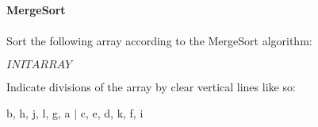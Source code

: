 \documentclass[12pt]{article}
\begin{document}
    \textbf{\LARGE{\color{tumgadPurple} MergeSort}}\\
    \\
    \noindent
    Sort the following array according to the MergeSort algorithm:
    \begin{center}
        $INITARRAY$
    \end{center}
    Indicate divisions of the array by clear vertical lines like so:
    \noindent
    \begin{center}
        b, h, j, l, g, a $|$ c, e, d, k, f, i\\
        \vspace{10px}
    \end{center}
    \noindent{}
\end{document}
